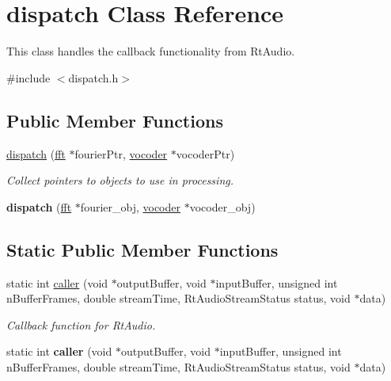 \hypertarget{classdispatch}{\section{dispatch Class Reference}
\label{classdispatch}
}


This class handles the callback functionality from Rt\-Audio.  




{\ttfamily \#include $<$dispatch.\-h$>$}

\subsection*{Public Member Functions}
\begin{DoxyCompactItemize}
\item 
\hypertarget{classdispatch_a641ec1136a8fdecb8b9ab51fa672a848}{\hyperlink{classdispatch_a641ec1136a8fdecb8b9ab51fa672a848}{dispatch} (\hyperlink{classfft}{fft} $\ast$fourier\-Ptr, \hyperlink{classvocoder}{vocoder} $\ast$vocoder\-Ptr)}\label{classdispatch_a641ec1136a8fdecb8b9ab51fa672a848}

\begin{DoxyCompactList}\small\item\em Collect pointers to objects to use in processing. \end{DoxyCompactList}\item 
\hypertarget{classdispatch_a49638cdbc0fee44e411973f09fc64d83}{{\bfseries dispatch} (\hyperlink{classfft}{fft} $\ast$fourier\-\_\-obj, \hyperlink{classvocoder}{vocoder} $\ast$vocoder\-\_\-obj)}\label{classdispatch_a49638cdbc0fee44e411973f09fc64d83}

\end{DoxyCompactItemize}
\subsection*{Static Public Member Functions}
\begin{DoxyCompactItemize}
\item 
\hypertarget{classdispatch_a78e0b45ddb573d1b843ce02cd9092557}{static int \hyperlink{classdispatch_a78e0b45ddb573d1b843ce02cd9092557}{caller} (void $\ast$output\-Buffer, void $\ast$input\-Buffer, unsigned int n\-Buffer\-Frames, double stream\-Time, Rt\-Audio\-Stream\-Status status, void $\ast$data)}\label{classdispatch_a78e0b45ddb573d1b843ce02cd9092557}

\begin{DoxyCompactList}\small\item\em Callback function for Rt\-Audio. \end{DoxyCompactList}\item 
\hypertarget{classdispatch_a2bc93711c1aee895c430aece41ec026a}{static int {\bfseries caller} (void $\ast$output\-Buffer, void $\ast$input\-Buffer, unsigned int n\-Buffer\-Frames, double stream\-Time, Rt\-Audio\-Stream\-Status status, void $\ast$data)}\label{classdispatch_a2bc93711c1aee895c430aece41ec026a}

\end{DoxyCompactItemize}
